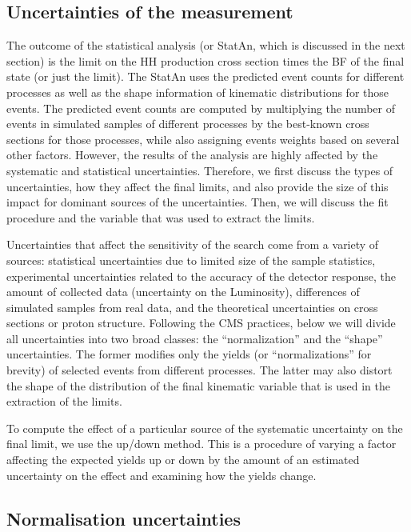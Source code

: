 \begin{small}
\section{Uncertainties of the measurement}
\label{sec:Systematics}

The outcome of the statistical analysis (or StatAn, which is discussed in the next section) is the limit on the HH production cross section times the BF of the final state (or just the limit). The StatAn uses the predicted event counts for different processes as well as the shape information of kinematic distributions for those events. The predicted event counts are computed by multiplying the number of events in simulated samples of different processes by the best-known cross sections for those processes, while also assigning events weights based on several other factors. However, the results of the analysis are highly affected by the systematic and statistical uncertainties. Therefore, we first discuss the types of uncertainties, how they affect the final limits, and also provide the size of this impact for dominant sources of the uncertainties. Then, we will discuss the fit procedure and the variable that was used to extract the limits. 

Uncertainties that affect the sensitivity of the search come from a variety of sources: statistical uncertainties due to limited size of the sample statistics, experimental uncertainties related to the accuracy of the detector response, the amount of collected data (uncertainty on the Luminosity), differences of simulated samples from real data, and the theoretical uncertainties on cross sections or proton structure. Following the CMS practices, below we will divide all uncertainties into two broad classes: the ``normalization'' and the ``shape''  uncertainties. The former modifies only the yields (or ``normalizations'' for brevity) of selected events from different processes. The latter may also distort the shape of the distribution of the final kinematic variable that is used in the extraction of the limits.

To compute the effect of a particular source of the systematic uncertainty on the final limit, we use the up/down method. This is a procedure of varying a factor affecting the expected yields up or down by the amount of an estimated uncertainty on the effect and examining how the yields change.
 
\subsection{Normalisation uncertainties}


\end{small}
